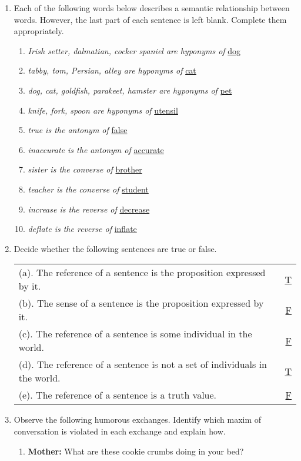 \documentclass[letterpaper,12pt]{article}
\begin{document}
\begin{enumerate}
    \item Each of the following words below describes a semantic relationship between words.
        However, the last part of each sentence is left blank. Complete them appropriately.
    \begin{enumerate}[label=(\alph*).]
        \item \textit{Irish setter, dalmatian, cocker spaniel are hyponyms of} \underline{dog} 
        \item \textit{tabby, tom, Persian, alley are hyponyms of} \underline{cat}
        \item \textit{dog, cat, goldfish, parakeet, hamster are hyponyms of} \underline{pet}
        \item \textit{knife, fork, spoon are hyponyms of} \underline{utensil}
        \item \textit{true is the antonym of} \underline{false}
        \item \textit{inaccurate is the antonym of} \underline{accurate}
        \item \textit{sister is the converse of} \underline{brother}
        \item \textit{teacher is the converse of} \underline{student}
        \item \textit{increase is the reverse of} \underline{decrease}
        \item \textit{deflate is the reverse of} \underline{inflate}
    \end{enumerate}
    \item Decide whether the following sentences are true or false.
    \begin{table}[htpb]
        \begin{tabular}{l r}
        \qquad(a). The reference of a sentence is the proposition expressed by it. & \underline{T}\\
        \qquad(b). The sense of a sentence is the proposition expressed by it. & \underline{F}\\
        \qquad(c). The reference of a sentence is some individual in the world. & \underline{F}\\
        \qquad(d). The reference of a sentence is not a set of individuals in the world. & \underline{T}\\
        \qquad(e). The reference of a sentence is a truth value. & \underline{F}\\
        \end{tabular}
    \end{table}
\item Observe the following humorous exchanges. Identify which maxim of conversation is violated in each exchange
    and explain how.
    \begin{enumerate}[label=(\alph*).]
        \item \textbf{Mother:} What are these cookie crumbs doing in your bed?



\end{enumerate}
\end{enumerate}
\end{document}

